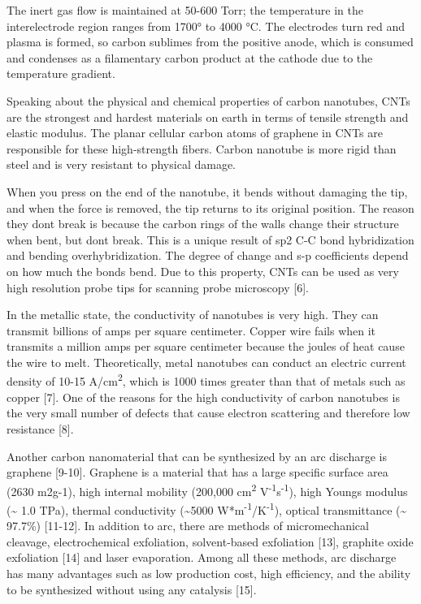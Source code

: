 \begin{multicols}{2}
The inert gas flow is maintained at 50-600 Torr; the temperature in the
interelectrode region ranges from 1700° to 4000 °C. The electrodes turn
red and plasma is formed, so carbon sublimes from the positive anode,
which is consumed and condenses as a filamentary carbon product at the
cathode due to the temperature gradient.

Speaking about the physical and chemical properties of carbon nanotubes,
CNTs are the strongest and hardest materials on earth in terms of
tensile strength and elastic modulus. The planar cellular carbon atoms
of graphene in CNTs are responsible for these high-strength fibers.
Carbon nanotube is more rigid than steel and is very resistant to
physical damage.

When you press on the end of the nanotube, it bends without damaging the
tip, and when the force is removed, the tip returns to its original
position. The reason they don\textquotesingle t break is because the
carbon rings of the walls change their structure when bent, but
don\textquotesingle t break. This is a unique result of sp2 C-C bond
hybridization and bending overhybridization. The degree of change and
s-p coefficients depend on how much the bonds bend. Due to this
property, CNTs can be used as very high resolution probe tips for
scanning probe microscopy {[}6{]}.

In the metallic state, the conductivity of nanotubes is very high. They
can transmit billions of amps per square centimeter. Copper wire fails
when it transmits a million amps per square centimeter because the
joules of heat cause the wire to melt. Theoretically, metal nanotubes
can conduct an electric current density of 10-15
A/cm\textsuperscript{2}, which is 1000 times greater than that of metals
such as copper {[}7{]}. One of the reasons for the high conductivity of
carbon nanotubes is the very small number of defects that cause electron
scattering and therefore low resistance {[}8{]}.

Another carbon nanomaterial that can be synthesized by an arc discharge
is graphene {[}9-10{]}. Graphene is a material that has a large specific
surface area (2630 m2g-1), high internal mobility (200,000
cm\textsuperscript{2} V\textsuperscript{-1}s\textsuperscript{-1}), high
Young\textquotesingle s modulus (\textasciitilde{} 1.0 TPa), thermal
conductivity (\textasciitilde5000
W*m\textsuperscript{-1}/K\textsuperscript{-1}), optical transmittance
(\textasciitilde{} 97.7\%) {[}11-12{]}. In addition to arc, there are
methods of micromechanical cleavage, electrochemical exfoliation,
solvent-based exfoliation {[}13{]}, graphite oxide exfoliation {[}14{]}
and laser evaporation. Among all these methods, arc discharge has many
advantages such as low production cost, high efficiency, and the ability
to be synthesized without using any catalysis {[}15{]}.


\end{multicols}
